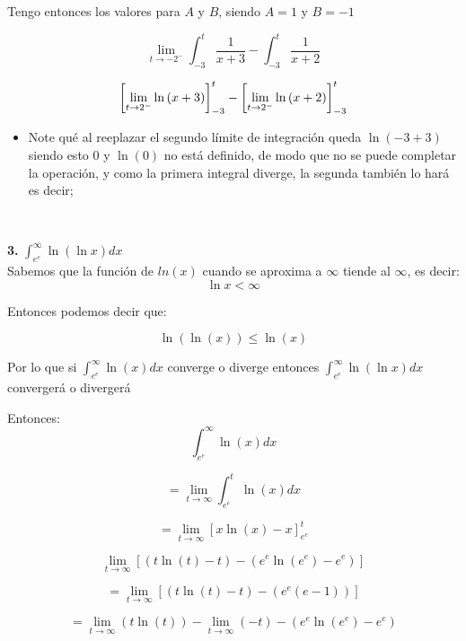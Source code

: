 \documentclass[12pt]{article}
\begin{document}
\begin{flushleft}
Tengo entonces los valores para $A$ y $B$, siendo $A=1$ y $B = -1$

$$\lim_{t \to -2^{-}} \int_{-3}^{t} \frac{1}{x+3}-\int_{-3}^{t} \frac{1}{x+2}$$

$$\left[\lim_{t \to \-2^{-}} \ln \left(x+3\right)\right]_{-3}^{t}-\left[\lim_{t \to \-2^{-}} \ln\left(x+2\right)\right]_{-3}^{t}$$
\vspace{0.5cm}


\begin{itemize}
    \item Note qué al reeplazar el segundo límite de integración queda $\ln(-3+3)$ siendo esto $0$ y $\ln(0)$ no está definido, de modo que no se puede completar la operación, y como la primera integral diverge, la segunda también lo hará es decir; 
\end{itemize}



\\




\newpage



\textbf{3.} $\int_{e^{e}}^{\infty }\ln\left ( \ln x \right )dx$\\


Sabemos que la función de $ln(x)$ cuando se aproxima a $\infty$ tiende al $\infty$, es decir:\\

$$\ln{x} < \infty$$

Entonces podemos decir que:

$$\ln(\ln(x)) \leq  \ln(x)$$

Por lo que si $\int_{e^{e}}^{\infty }\ln\left ( x \right )dx$ converge o diverge entonces $\int_{e^{e}}^{\infty }\ln\left ( \ln x \right )dx$ convergerá o divergerá

Entonces: 
$$\int_{e^{e}}^{\infty }\ln\left ( x \right )dx$$

$$= \lim_{t \to \infty } \int_{e^{e}}^{t} \ln(x)dx $$

$$= \lim_{t \to \infty } \left[ x\ln(x) - x \right]^{t}_{e^e} $$

$$\lim_{t \to \infty } \left[ \left( 
t\ln(t) - t \right) - \left( e^e \ln(e^e) - e^e
 \right) \right]$$

$$= \lim_{t \to \infty } \left[ \left( 
t\ln(t) - t \right) - \left( e^e(e-1)
 \right) \right]$$

$$ = \lim_{t \to \infty } \left( 
t\ln(t)  \right) - \lim_{t \to \infty } \left( - t \right)  - \left( e^e \ln(e^e) - e^e
 \right) $$


\end{flushleft}
\end{document}
